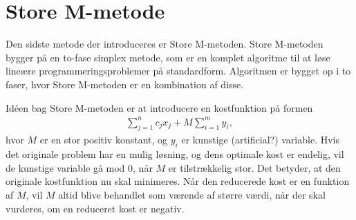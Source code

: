 \section{Store M-metode}

Den sidste metode der introduceres er Store M-metoden. Store M-metoden bygger på en to-fase simplex metode, som er en komplet algoritme til at løse lineære programmeringsproblemer på standardform. Algoritmen er bygget op i to faser, hvor Store M-metoden er en kombination af disse. 

Idéen bag Store M-metoden er at introducere en kostfunktion på formen
\begin{align*}
\sum\limits_{j=1}^n c_jx_j + M \sum\limits_{i=1}^m y_i,
\end{align*}
hvor $M$ er en stor positiv konstant, og $y_i$ er kunstige (artificial?) variable. 
Hvis det originale problem har en mulig løsning, og dens optimale kost er endelig, vil de kunstige variable gå mod $0$, når $M$ er tilstrækkelig stor. 
Det betyder, at den originale kostfunktion nu skal minimeres. 
Når den reducerede kost er en funktion af $M$, vil $M$ altid blive behandlet som værende af større værdi, når der skal vurderes, om en reduceret kost er negativ. \\

